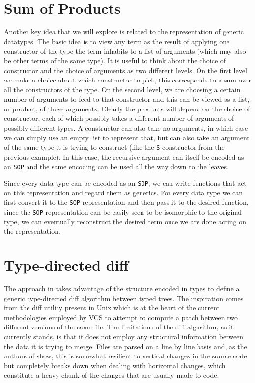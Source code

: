 \documentclass[11pt]{article}
\begin{document}
\section{Sum of Products}

Another key idea that we will explore is related to the representation of 
generic datatypes. The basic idea is to view any term as the result of applying 
one constructor of the type the term inhabits to a list of arguments (which may also be other terms of the
same type). It is useful to think about the choice of constructor and the choice 
of arguments as two different levels. On the first level we 
make a choice about which constructor to pick, this corresponds to a sum
over all the constructors of the type. On the second level, we are choosing a certain number of arguments 
to feed to that constructor and this can be viewed as a list, or product, of 
those arguments. Clearly the products will depend on the choice of constructor, 
each of which possibly takes a different number of arguments of possibly 
different types. A constructor can also take no arguments, in which case we 
can simply use an empty list to represent that, but can also take an argument of 
the same type it is trying to construct (like the \texttt{S} constructor from the previous example). 
In this case, the recursive argument can itself be encoded as an \texttt{SOP} 
and the same encoding can be used all the way down to the leaves.

Since every data type can be encoded as an \texttt{SOP}, we can write functions 
that act on this representation and regard them as generics. For every data type 
we can first convert it to the \texttt{SOP} representation and then pass it to 
the desired function, since the \texttt{SOP} representation can be easily 
seen to be isomorphic to the original type, we can eventually reconstruct the 
desired term once we are done acting on the representation.

\section{Type-directed diff}\label{type-directed-diff}

The approach in \cite{type-directed diff} takes advantage of the structure 
encoded in types to define a generic type-directed diff algorithm between
typed trees. The inspiration comes from the diff utility present in
Unix which is at the heart of the current methodologies employed by VCS
to attempt to compute a patch between two different versions of the same
file. The limitations of the diff algorithm, as it currently stands, is
that it does not employ any structural information between the data it
is trying to merge. Files are parsed on a line by line basis and, as
the authors of \cite{type-directed diff} show, this is somewhat resilient to vertical changes in the
source code but completely breaks down when dealing with horizontal
changes, which constitute a heavy chunk of the changes that are usually
made to code.
\end{document}
